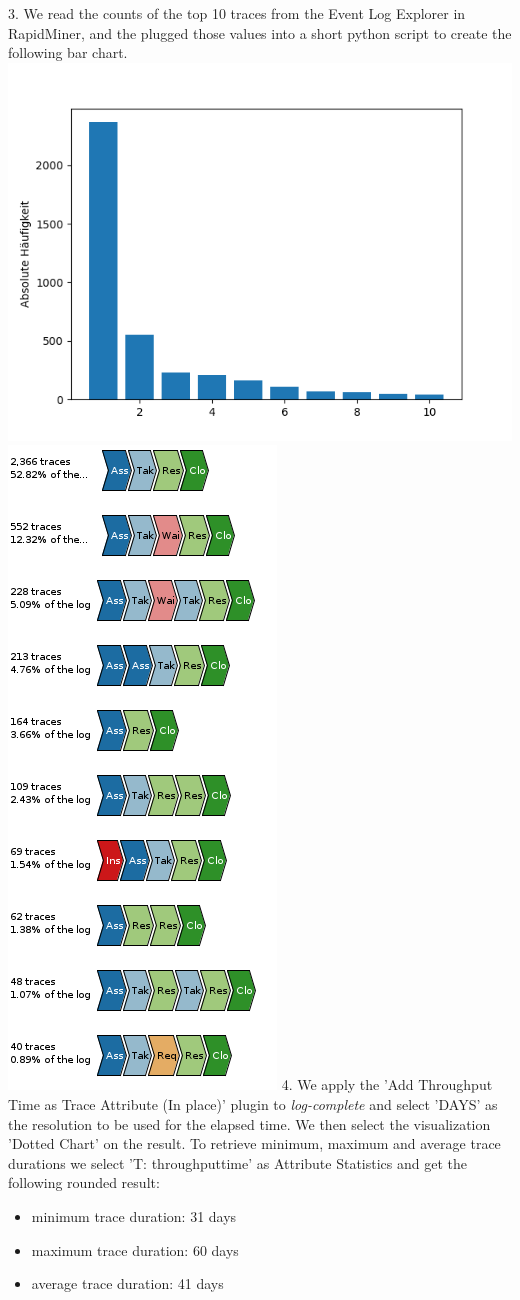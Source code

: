 \documentclass[../../main.tex]{subfiles}
\begin{document}
3. We read the counts of the top 10 traces from the Event Log Explorer in RapidMiner, and the plugged those values into a short python script to create the following bar chart.\\
\includegraphics[width=0.7\columnwidth]{img/RapidMiner_c_Chart.png}
\includegraphics[width=0.3\columnwidth]{img/RapidMiner_c_Variants.png}
4. We apply the 'Add Throughput Time as Trace Attribute (In place)' plugin to \textit{log-complete} and select 'DAYS' as the resolution to be used for the elapsed time. We then select the visualization 'Dotted Chart' on the result. To retrieve minimum, maximum and average trace durations we select 'T: throughputtime' as Attribute Statistics and get the following rounded result:
\begin{itemize}
\item minimum trace duration: 31 days
\item maximum trace duration: 60 days
\item average trace duration: 41 days
\end{itemize}
\end{document}
